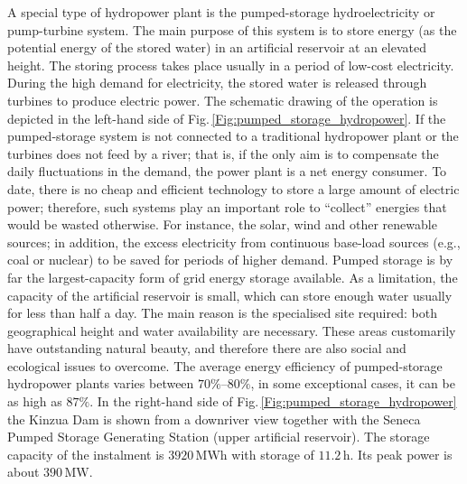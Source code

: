 A special type of hydropower plant is the pumped-storage hydroelectricity or pump-turbine system. The main purpose of this system is to store energy (as the potential energy of the stored water) in an artificial reservoir at an elevated height. The storing process takes place usually in a period of low-cost electricity. During the high demand for electricity, the stored water is released through turbines to produce electric power. The schematic drawing of the operation is depicted in the left-hand side of Fig.\,\ref{Fig:pumped_storage_hydropower}. If the pumped-storage system is not connected to a traditional hydropower plant or the turbines does not feed by a river; that is, if the only aim is to compensate the daily fluctuations in the demand, the power plant is a net energy consumer. To date, there is no cheap and efficient technology to store a large amount of electric power; therefore, such systems play an important role to ``collect'' energies that would be wasted otherwise. For instance, the solar, wind and other renewable sources; in addition, the excess electricity from continuous base-load sources (e.g., coal or nuclear) to be saved for periods of higher demand. Pumped storage is by far the largest-capacity form of grid energy storage available. As a limitation, the capacity of the artificial reservoir is small, which can store enough water usually for less than half a day. The main reason is the specialised site required: both geographical height and water availability are necessary. These areas customarily have outstanding natural beauty, and therefore there are also social and ecological issues to overcome. The average energy efficiency of pumped-storage hydropower plants varies between $70\%–80\%$, in some exceptional cases, it can be as high as $87\%$. In the right-hand side of Fig.\,\ref{Fig:pumped_storage_hydropower} the Kinzua Dam is shown from a downriver view together with the Seneca Pumped Storage Generating Station (upper artificial reservoir). The storage capacity of the instalment is $3920\,\mathrm{MWh}$ with storage of $11.2\,\mathrm{h}$. Its peak power is about $390\,\mathrm{MW}$.

